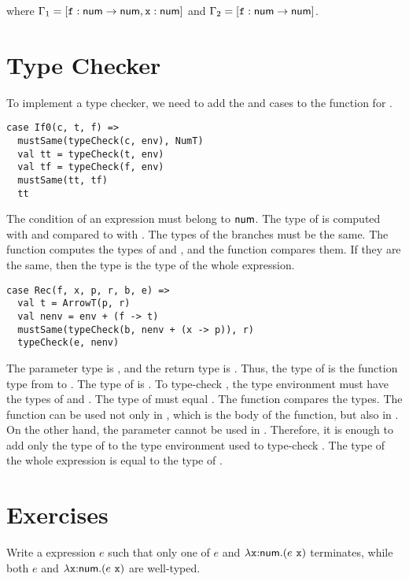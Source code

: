 where
$\Gamma_1=[\texttt{f}:\textsf{num}\rightarrow\textsf{num},\texttt{x}:\textsf{num}]$
and
$\Gamma_2=[\texttt{f}:\textsf{num}\rightarrow\textsf{num}]$.

\section{Type Checker}

To implement a type checker, we need to add the  and  cases
to the  function for \plang.

\begin{verbatim}
case If0(c, t, f) =>
  mustSame(typeCheck(c, env), NumT)
  val tt = typeCheck(t, env)
  val tf = typeCheck(f, env)
  mustSame(tt, tf)
  tt
\end{verbatim}

The condition of an expression must belong to $\textsf{num}$. The type of  is
computed with  and compared to  with .
The types of the branches must be the same. The  function
computes the types of  and , and the  function
compares them. If they are the same, then the type is the type of the whole expression.

\begin{verbatim}
case Rec(f, x, p, r, b, e) =>
  val t = ArrowT(p, r)
  val nenv = env + (f -> t)
  mustSame(typeCheck(b, nenv + (x -> p)), r)
  typeCheck(e, nenv)
\end{verbatim}

The parameter type is , and the return type is . Thus, the type
of  is the function type from  to . The type of 
is . To type-check , the type environment must have the types of
 and . The type of  must equal . The
 function compares the types. The function can be used not only in
, which is the body of the function, but also in . On the other
hand, the parameter  cannot be used in . Therefore, it is enough
to add only the type of  to the type environment used to type-check
. The type of the whole expression is equal to the type of .

\section{Exercises}

\begin{exercise}

Write a \Lang expression $e$ such that only one of $e$ and
  $\lambda\texttt{x}{:}\textsf{num}.(e\ \texttt{x})$ terminates, while both $e$ and
  $\lambda\texttt{x}{:}\textsf{num}.(e\ \texttt{x})$ are well-typed.

\end{exercise}

